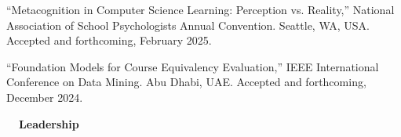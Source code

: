 \documentclass[hidelinks, 10.5pt]{article}
\newcommand{\contentwidth}{0.9\linewidth}
\newcommand{\contentspacing}{2.5mm}
\newcommand{\sectionspacing}{8mm}
\newcommand{\sectiontocontentspacing}{4mm}
\begin{document}
{\begin{minipage}[ct]{\contentwidth}
    ``Metacognition in Computer Science Learning: Perception vs. Reality,'' National Association of School Psychologists Annual Convention.
    Seattle, WA, USA. Accepted and forthcoming, February 2025.
\end{minipage}

\vspace{\contentspacing}

\begin{minipage}[ct]{\contentwidth}
    ``Foundation Models for Course Equivalency Evaluation,'' IEEE International Conference on Data Mining.  Abu Dhabi, UAE.  Accepted and
    forthcoming, December 2024.
\end{minipage}

\vspace{\sectionspacing}











{\fontsize{14}{14}\selectfont \textbf{\ \ Leadership\ \ }}\hrulefill

\vspace{\sectiontocontentspacing}

}
\end{document}
